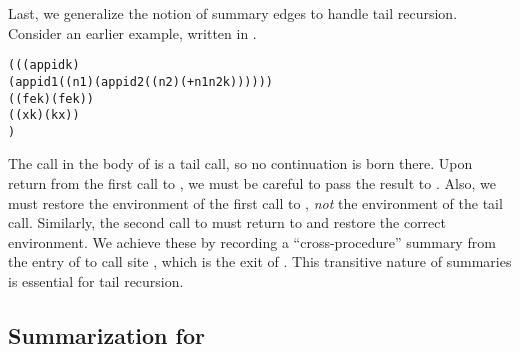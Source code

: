 \documentclass{LMCS}
\theoremstyle{definition} \newtheorem{property}[thm]{Property}
\begin{document}
\noindent Last, we generalize the notion of summary edges to handle tail recursion.
Consider an earlier example, written in \cps.
\begin{center}
  \begin{minipage}{0.75\columnwidth}
    \begin{alltt}
((\lam(app id k) 
   (app id 1 ((n1) (app id 2 ((n2) (+ n1 n2 k))))))
 (\lam(f e k) (f e k))
 (\lam(x k) (k x))
 \haltcont) \end{alltt}    
  \end{minipage}
\end{center}
The call  in the body of  is a tail call, so no continuation
is born there.
Upon return from the first call to , we must be careful to pass the 
result to .
Also, we must restore the environment of the first call to , \emph{not}
the environment of the tail call.
Sim\-i\-lar\-ly, the second call to  must return to  and restore
the correct environment.
We achieve these by recording a ``cross-procedure'' summary from the entry of 
 to call site , which is the exit of .
This transitive nature of summaries is essential for tail recursion.


\subsection{Summarization for \cfat \label{subsec:summarization}}
\end{document}
